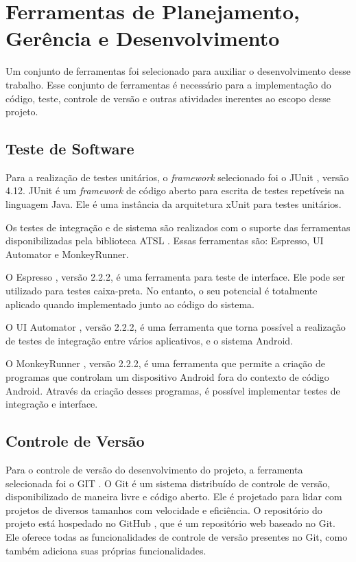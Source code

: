 \section{Ferramentas de Planejamento, Gerência e Desenvolvimento}
\label{sec:tecsuportedesenvolvimento}

Um conjunto de ferramentas foi selecionado para auxiliar o desenvolvimento
desse trabalho. Esse conjunto de ferramentas é necessário para a implementação
do código, teste, controle de versão e outras atividades inerentes ao escopo
desse projeto.

    \subsection{Teste de Software}
    \label{subsec:testedesoftwaresuptecnologico}

Para a realização de testes unitários, o \textit{framework} selecionado foi o
JUnit \cite{junit2015}, versão 4.12. JUnit é um \textit{framework} de código
aberto para escrita de testes repetíveis na linguagem Java. Ele é uma instância
da arquitetura xUnit para testes unitários.

Os testes de integração e de sistema são realizados com o suporte das
ferramentas disponibilizadas pela biblioteca ATSL \cite{atsl}. Essas
ferramentas são: Espresso, UI Automator e MonkeyRunner.

O Espresso \cite{espresso}, versão 2.2.2, é uma ferramenta para teste de
interface. Ele pode ser utilizado para testes caixa-preta. No entanto, o seu
potencial é totalmente aplicado quando implementado junto ao código do sistema.

O UI Automator \cite{uiAutomator}, versão 2.2.2, é uma ferramenta que torna
possível a realização de testes de integração entre vários aplicativos, e o
sistema Android.

O MonkeyRunner \cite{monkeyRunner}, versão 2.2.2, é uma ferramenta que permite
a criação de programas que controlam um dispositivo Android fora do contexto de
código Android. Através da criação desses programas, é possível implementar testes de integração e interface.

    \subsection{Controle de Versão}

Para o controle de versão do desenvolvimento do projeto, a ferramenta
selecionada foi o GIT \cite{git}. O Git é um sistema distribuído de controle de
versão, disponibilizado de maneira livre e código aberto. Ele é projetado para
lidar com projetos de diversos tamanhos com velocidade e eficiência. O
repositório do projeto está hospedado no GitHub \cite{gitHub}, que é um
repositório web baseado no Git. Ele oferece todas as funcionalidades de
controle de versão presentes no Git, como também adiciona suas próprias
funcionalidades.

